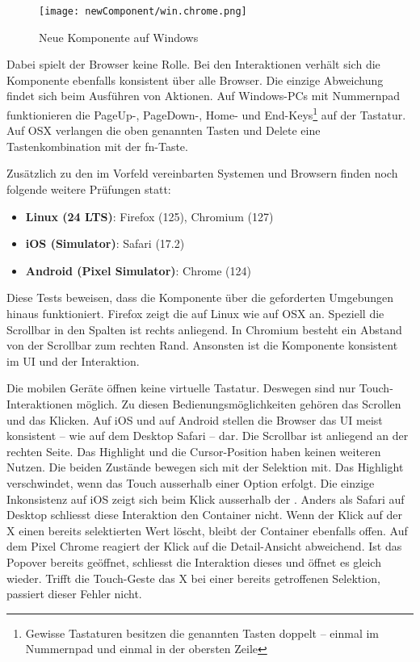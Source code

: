 \begin{figure}[!htb]
    \centering
    \texttt{[image: newComponent/win.chrome.png]}
    \caption{\centering Neue Komponente auf Windows}
    \label{img:manualTestComponentWin}
\end{figure}

Dabei spielt der Browser keine Rolle. 
Bei den Interaktionen verhält sich die Komponente ebenfalls konsistent über alle Browser. 
Die einzige Abweichung findet sich beim Ausführen von Aktionen. 
Auf Windows-PCs mit Nummernpad funktionieren die Page\-Up-, Page\-Down-, Home- und End-Keys\footnote{
    Gewisse Tastaturen besitzen die genannten Tasten doppelt – einmal im Nummernpad und einmal in der obersten Zeile
} auf der Tastatur. 
Auf OSX verlangen die oben genannten Tasten und Delete eine Tastenkombination mit der fn-Taste. 

Zusätzlich zu den im Vorfeld vereinbarten Systemen und Browsern finden noch folgende weitere Prüfungen statt: 

\begin{itemize}
    \item \textbf{Linux (24 LTS)}: Firefox (125), Chromium (127)
    \item \textbf{iOS (Simulator)}: Safari (17.2)
    \item \textbf{Android (Pixel Simulator)}: Chrome (124)
\end{itemize}

Diese Tests beweisen, dass die Komponente über die geforderten Umgebungen hinaus funktioniert. 
Firefox zeigt die  auf Linux wie auf OSX an. 
Speziell die Scrollbar in den Spalten ist rechts anliegend. 
In Chromium besteht ein Abstand von der Scrollbar zum rechten Rand. 
Ansonsten ist die Komponente konsistent im UI und der Interaktion. 

Die mobilen Geräte öffnen keine virtuelle Tastatur. 
Deswegen sind nur Touch-Inter\-aktionen möglich. 
Zu diesen Bedienungsmöglichkeiten gehören das Scrollen und das Klicken. 
Auf iOS und auf Android stellen die Browser das UI meist konsistent – wie auf dem Desktop Safari – dar. 
Die Scrollbar ist anliegend an der rechten Seite. 
Das Highlight und die Cursor-Position haben keinen weiteren Nutzen. 
Die beiden Zustände bewegen sich mit der Selektion mit. 
Das Highlight verschwindet, wenn das Touch ausserhalb einer Option erfolgt. 
Die einzige Inkonsistenz auf iOS zeigt sich beim Klick ausserhalb der . 
Anders als Safari auf Desktop schliesst diese Interaktion den Container nicht. 
Wenn der Klick auf der X einen bereits selektierten Wert löscht, bleibt der Container ebenfalls offen. 
Auf dem Pixel Chrome reagiert der Klick auf die Detail-Ansicht abweichend. 
Ist das Popover bereits geöffnet, schliesst die Interaktion dieses und öffnet es gleich wieder. 
Trifft die Touch-Geste das X bei einer bereits getroffenen Selektion, passiert dieser Fehler nicht.  

